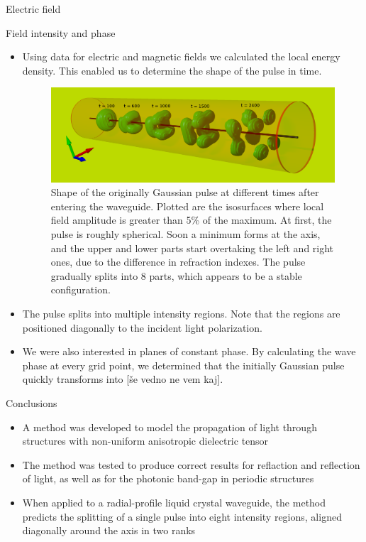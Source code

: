 \documentclass{beamer}
\newlength{\wideitemsep}
\let\olditem\item
\renewcommand{\item}{\setlength{\itemsep}{\wideitemsep}\olditem}
\newcommand{\blockpadding}{
  \rule[-0.6ex]{0pt}{2.5ex}
}
\begin{document}
\begin{columns}[t]
\begin{column}{0.596\textwidth}
\begin{block}{\blockpadding Electric field}
\end{block}
\begin{block}{\blockpadding Field intensity and phase}
\begin{itemize}
 \item Using data for electric and magnetic fields we calculated the local energy density. This enabled us to determine the shape of the pulse in time. 
 \begin{figure}[h]
  \centering
  \includegraphics[width=.825\textwidth]{./intensity_gauss_t}
  \caption{Shape of the originally Gaussian pulse at different times after entering the waveguide. Plotted are the isosurfaces where local field amplitude is greater than 5\% of the maximum. At first, the pulse is roughly spherical. Soon a minimum forms at the axis, and the upper and lower parts start overtaking the left and right ones, due to the difference in refraction indexes. The pulse gradually splits into 8 parts, which appears to be a stable configuration. }
 \end{figure}
 \item The pulse splits into multiple intensity regions. Note that the regions are positioned diagonally to the incident light polarization. 

 \item We were also interested in planes of constant phase. By calculating the wave phase at every grid point, we determined that the initially Gaussian pulse quickly transforms into [\v se vedno ne vem kaj]. 
\end{itemize}


\end{block}

\begin{block}{\blockpadding Conclusions}
 \begin{itemize}
  \item A method was developed to model the propagation of light through structures with non-uniform anisotropic dielectric tensor
  \item The method was tested to produce correct results for reflaction and reflection of light, as well as for the photonic band-gap in periodic structures
  \item When applied to a radial-profile liquid crystal waveguide, the method predicts the splitting of a single pulse into eight intensity regions, aligned diagonally around the axis in two ranks
 \end{itemize}

\end{block}

 \end{column}

\end{columns}
\end{document}
